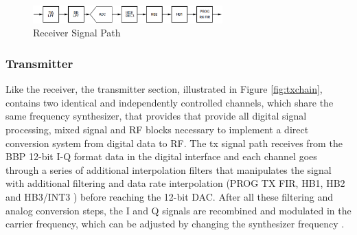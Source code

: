 \begin{figure}[htbp]
    \centering
    \includegraphics[width=0.65\textwidth]{./figures/rx_chain}
    \caption{ Receiver Signal Path
    \label{fig:rxchain}}
\end{figure}


\subsubsection{Transmitter}




Like the receiver, the transmitter section, illustrated in Figure
\ref{fig:txchain}, contains two identical and independently controlled channels,
which share the same frequency synthesizer, that provides that provide all
digital signal processing, mixed signal and RF blocks necessary to implement a
direct conversion system from digital data to RF. The tx signal path receives
from the BBP 12-bit I-Q format data in the digital interface and each channel
goes through a series of additional interpolation filters that manipulates the
signal with additional filtering and data rate interpolation (PROG TX FIR, HB1,
HB2 and HB3/INT3 ) before reaching the 12-bit DAC. After all these filtering and
analog conversion steps, the I and Q signals are recombined and modulated in the
carrier frequency, which can be adjusted by changing the synthesizer frequency
\cite{ad:ad9361}.

